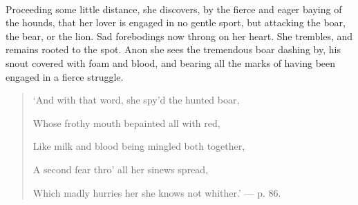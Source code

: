 \documentclass[a4paper, 11pt, oneside, polutonikogreek, english]{article}
\begin{document}
\paragraph{}
Proceeding some little distance, she discovers, by the fierce and eager baying of the hounds, that her lover is engaged in no gentle sport, but attacking the boar, the bear, or the lion. Sad forebodings now throng on her heart. She trembles, and remains rooted to the spot. Anon she sees the tremendous boar dashing by, his snout covered with foam and blood, and bearing all the marks of having been engaged in a fierce struggle.
\begin{quotation}\footnotesize
`And with that word, she spy'd the hunted boar,

Whose frothy mouth bepainted all with red,

Like milk and blood being mingled both together,

A second fear thro' all her sinews spread,

Which madly hurries her she knows not whither.' --- p. 86.
\end{quotation}
\end{document}
